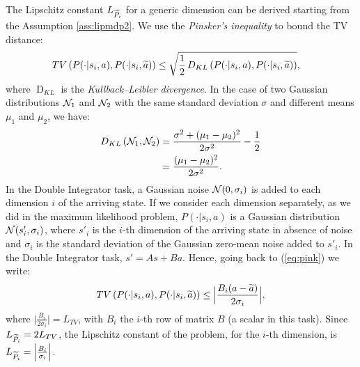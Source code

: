 \newline
The Lipschitz constant $L_{\widetilde{P}_{i}}$ for a generic dimension can be derived starting from the Assumption \ref{ass:lipmdp2}. We use the \emph{Pinsker's inequality} to bound the \ac{TV} distance:
\begin{align}
\mathop{TV}\left(P(\cdot|s_{i},a), P(\cdot| s_{i},\widetilde{a})\right) &\leq \sqrt{\frac{1}{2}\mathop{D_{KL}}\left(P(\cdot|s_{i},a), P(\cdot| s_{i},\widetilde{a})\right)}, \label{eq:pink}
\end{align}
where $\mathop{D}_{KL}$ is the \emph{Kullback–Leibler divergence}. In the case of two Gaussian distributions $\mathcal{N}_1$ and $\mathcal{N}_2$ with the same standard deviation $\sigma$ and different means $\mu_1$ and $\mu_2$, we have:
\begin{align}
	\mathop{D_{KL}}\left(\mathcal{N}_1, \mathcal{N}_2\right) &= \frac{\sigma^2 + (\mu_1 - \mu_2)^2}{2\sigma^2} - \frac{1}{2} \nonumber\\
	&= \frac{(\mu_1 - \mu_2)^2}{2\sigma^2}.
\end{align}
In the Double Integrator task, a Gaussian noise $\mathcal{N}(0, \sigma_{i})$ is added to each dimension $i$ of the arriving state. If we consider each dimension separately, as we did in the maximum likelihood problem, $P(\cdot|s_{i},a)$ is a Gaussian distribution $\mathcal{N}(s'_{i}, \sigma_{i})$, where $s'_{i}$ is the $i$-th dimension of the arriving state in absence of noise and $\sigma_{i}$ is the standard deviation of the Gaussian zero-mean noise added to $s'_{i}$. In the Double Integrator task, $s' = As + Ba$. Hence, going back to (\ref{eq:pink}) we write:
\begin{align}
	\mathop{TV}\left(P(\cdot|s_{i},a), P(\cdot| s_{i},\widetilde{a})\right) \leq \Big| \frac{B_{i} (a - \widetilde{a})}{2\sigma_{i}}\Big|,
\end{align}
where $\Big| \frac{B_{i}}{2\sigma_{i}} \Big| = L_{TV}$, with $B_{i}$ the $i$-th row of matrix $B$ (a scalar in this task). Since $L_{\widetilde{P}_{i}}=2L_{TV}$, the Lipschitz constant of the problem, for the $i$-th dimension, is $L_{\widetilde{P}_{i}} = \Big| \frac{B_{i}}{\sigma_{i}} \Big|$.